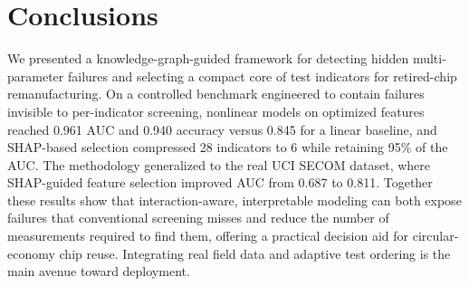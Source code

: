 \documentclass[electronics,article,submit,pdftex,moreauthors]{Definitions/mdpi}
\begin{document}
\section{Conclusions}
We presented a knowledge-graph-guided framework for detecting hidden multi-parameter failures and selecting a compact core of test indicators for retired-chip remanufacturing. On a controlled benchmark engineered to contain failures invisible to per-indicator screening, nonlinear models on optimized features reached 0.961 AUC and 0.940 accuracy versus 0.845 for a linear baseline, and SHAP-based selection compressed 28 indicators to 6 while retaining 95\% of the AUC. The methodology generalized to the real UCI SECOM dataset, where SHAP-guided feature selection improved AUC from 0.687 to 0.811. Together these results show that interaction-aware, interpretable modeling can both expose failures that conventional screening misses and reduce the number of measurements required to find them, offering a practical decision aid for circular-economy chip reuse. Integrating real field data and adaptive test ordering is the main avenue toward deployment.

\vspace{6pt}



\end{document}
